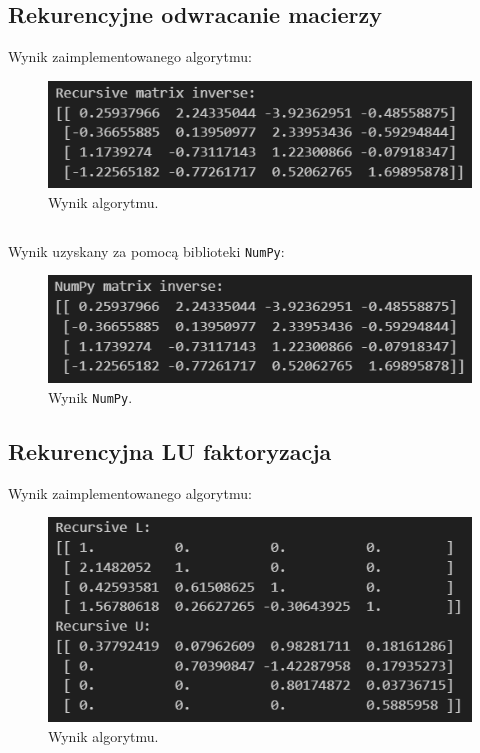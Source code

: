 \documentclass[11pt, leqno]{scrartcl}
\begin{document}
    \subsection{Rekurencyjne odwracanie macierzy}
    Wynik zaimplementowanego algorytmu:
    \begin{figure}[H]
        \centering
        \includegraphics[width=0.7\linewidth]{por_inv_alg.png}
        \caption{Wynik algorytmu.}
    \end{figure}
    \subsection*{}
    Wynik uzyskany za pomocą biblioteki \texttt{NumPy}:
    \begin{figure}[H]
        \centering
        \includegraphics[width=0.7\linewidth]{por_inv_np.png}
        \caption{Wynik \texttt{NumPy}.}
    \end{figure}

    \subsection{Rekurencyjna LU faktoryzacja}
    Wynik zaimplementowanego algorytmu:
    \begin{figure}[H]
        \centering
        \includegraphics[width=0.7\linewidth]{por_lu_alg.png}
        \caption{Wynik algorytmu.}
    \end{figure}
\end{document}
